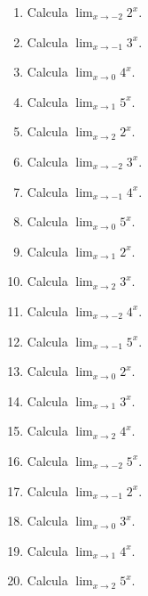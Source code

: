 \documentclass[11pt,a4paper]{article}
\begin{document}
\begin{enumerate}[label=\textbf{E\arabic*.},start=301]

\item Calcula $\displaystyle\lim_{x\to -2}2^x$.

\item Calcula $\displaystyle\lim_{x\to -1}3^x$.

\item Calcula $\displaystyle\lim_{x\to 0}4^x$.

\item Calcula $\displaystyle\lim_{x\to 1}5^x$.

\item Calcula $\displaystyle\lim_{x\to 2}2^x$.

\item Calcula $\displaystyle\lim_{x\to -2}3^x$.

\item Calcula $\displaystyle\lim_{x\to -1}4^x$.

\item Calcula $\displaystyle\lim_{x\to 0}5^x$.

\item Calcula $\displaystyle\lim_{x\to 1}2^x$.

\item Calcula $\displaystyle\lim_{x\to 2}3^x$.

\item Calcula $\displaystyle\lim_{x\to -2}4^x$.

\item Calcula $\displaystyle\lim_{x\to -1}5^x$.

\item Calcula $\displaystyle\lim_{x\to 0}2^x$.

\item Calcula $\displaystyle\lim_{x\to 1}3^x$.

\item Calcula $\displaystyle\lim_{x\to 2}4^x$.

\item Calcula $\displaystyle\lim_{x\to -2}5^x$.

\item Calcula $\displaystyle\lim_{x\to -1}2^x$.

\item Calcula $\displaystyle\lim_{x\to 0}3^x$.

\item Calcula $\displaystyle\lim_{x\to 1}4^x$.

\item Calcula $\displaystyle\lim_{x\to 2}5^x$.

\end{enumerate}
\end{document}
